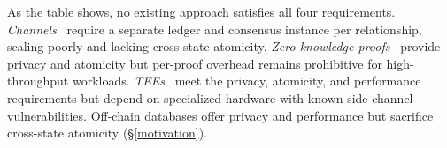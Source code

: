 \begin{table}[h]
  \vspace{-0.2cm}
\centering
\small
\caption{Comparison of Privacy Mechanisms}
  \vspace{-0.4cm}
\label{table:comparison}
  \vspace{-0.2cm}
\end{table}

As the table shows, no existing approach satisfies all four requirements. \textit{Channels}~\cite{hf} require a separate ledger and consensus instance per relationship, scaling poorly and lacking cross-state atomicity. \textit{Zero-knowledge proofs}~\cite{inproceedings, 7546538} provide privacy and atomicity but per-proof overhead remains prohibitive for high-throughput workloads. \textit{TEEs}~\cite{ekiden, ccf} meet the privacy, atomicity, and performance requirements but depend on specialized hardware with known side-channel vulnerabilities. Off-chain databases offer privacy and performance but sacrifice cross-state atomicity (\S\ref{motivation}).

